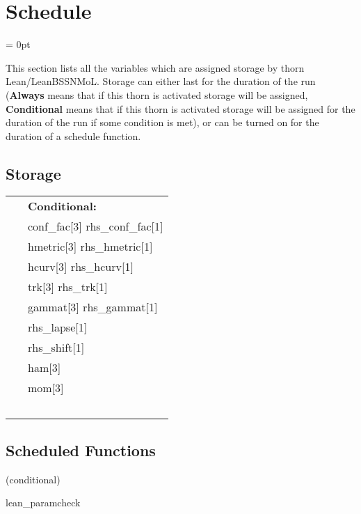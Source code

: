 
\section{Schedule} 


\parskip = 0pt


\noindent This section lists all the variables which are assigned storage by thorn Lean/LeanBSSNMoL.  Storage can either last for the duration of the run ({\bf Always} means that if this thorn is activated storage will be assigned, {\bf Conditional} means that if this thorn is activated storage will be assigned for the duration of the run if some condition is met), or can be turned on for the duration of a schedule function.


\subsection*{Storage}

\hspace{5mm}

 \begin{tabular*}{160mm}{ll} 
~& {\bf Conditional:} \\ 
~ &  conf\_fac[3] rhs\_conf\_fac[1]\\ 
~ &  hmetric[3] rhs\_hmetric[1]\\ 
~ &  hcurv[3] rhs\_hcurv[1]\\ 
~ &  trk[3] rhs\_trk[1]\\ 
~ &  gammat[3] rhs\_gammat[1]\\ 
~ &  rhs\_lapse[1]\\ 
~ &  rhs\_shift[1]\\ 
~ &  ham[3]\\ 
~ &  mom[3]\\ 
~ & ~\\ 
\end{tabular*} 


\subsection*{Scheduled Functions}
\vspace{5mm}

   (conditional) 

\hspace{5mm} lean\_paramcheck 

\hspace{5mm}{\it check lean parameters for consistency } 


\hspace{5mm}

